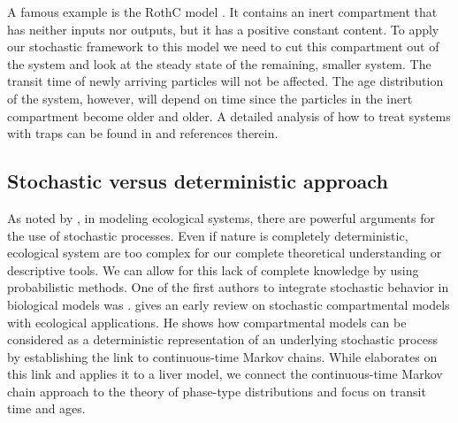 \documentclass[smallextended]{svjour3}
\begin{document}
A famous example is the RothC model \citep{Jenkinson1977SoilScience}.
It contains an inert compartment that has neither inputs nor outputs, but it has a positive constant content.
To apply our stochastic framework to this model we need to cut this compartment out of the system and look at the steady state of the remaining, smaller system.
The transit time of newly arriving particles will not be affected.
The age distribution of the system, however, will depend on time since the particles in the inert compartment become older and older.
A detailed analysis of how to treat systems with traps can be found in \citet{Jacquez1993SIAM} and references therein.

\subsection{Stochastic versus deterministic approach}


As noted by \citet{Purdue1979}, in modeling ecological systems, there are powerful arguments for the use of stochastic processes.
Even if nature is completely deterministic, ecological system are too complex for our complete theoretical understanding or descriptive tools.
We can allow for this lack of complete knowledge by using probabilistic methods.
One of the first authors to integrate stochastic behavior in biological models was \citet{Bartholomay1958BMBP}.
\citet{Purdue1979} gives an early review on stochastic compartmental models with ecological applications.
He shows how compartmental models can be considered as a deterministic representation of an underlying stochastic process by establishing the link to continuous-time Markov chains.
While \citet{Eisenfeld1979MBS} elaborates on this link and applies it to a liver model, we connect the continuous-time Markov chain approach to the theory of phase-type distributions \citep{Neuts1981} and focus on transit time and ages.
\end{document}
